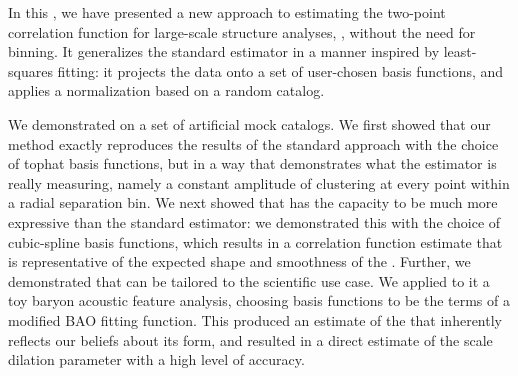 In this \documentname, we have presented a new approach to estimating the two-point correlation function for large-scale structure analyses, \est, without the need for binning.
It generalizes the standard \cf estimator in a manner inspired by least-squares fitting: it projects the data onto a set of user-chosen basis functions, and applies a normalization based on a random catalog.

We demonstrated \est on a set of artificial mock catalogs.
We first showed that our method exactly reproduces the results of the standard approach with the choice of tophat basis functions, but in a way that demonstrates what the estimator is really measuring, namely a constant amplitude of clustering at every point within a radial separation bin.
We next showed that \est has the capacity to be much more expressive than the standard estimator: we demonstrated this with the choice of cubic-spline basis functions, which results in a correlation function estimate that is representative of the expected shape and smoothness of the \cf.
Further, we demonstrated that \est can be tailored to the scientific use case.
We applied to it a toy baryon acoustic feature analysis, choosing basis functions to be the terms of a modified BAO fitting function.
This produced an estimate of the \cf that inherently reflects our beliefs about its form, and resulted in a direct estimate of the scale dilation parameter with a high level of accuracy.

